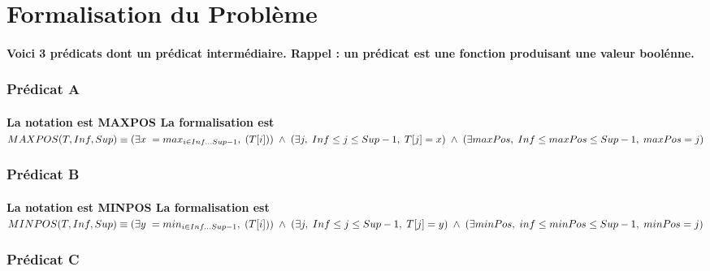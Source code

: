 \section{Formalisation du Problème}\label{formalisation}
\paragraph{Voici 3 prédicats dont un prédicat intermédiaire. Rappel : un prédicat est une fonction produisant une valeur boolénne.}
\subsubsection{Prédicat A}
\paragraph{La notation est MAXPOS \newline \newline
La formalisation est $MAXPOS(T,Inf,Sup)\equiv\newline (\exists x\;= max_{i \in Inf...Sup-1},\;(T[i]))\;\wedge\; (\exists j,\;Inf\leq j \leq Sup-1,\;T[j]=x)\;\wedge\;(\exists maxPos,\;Inf\leq maxPos \leq Sup-1,\;maxPos=j) $} \newline
\subsubsection{Prédicat B}
\paragraph{La notation est MINPOS \newline \newline
La formalisation est $MINPOS(T,Inf,Sup)\equiv\newline (\exists y\;= min_{i \in Inf...Sup-1},\;(T[i]))\;\wedge\; (\exists j,\;Inf\leq j \leq Sup-1,\;T[j]=y)\;\wedge\;(\exists minPos,\;inf\leq minPos \leq Sup-1,\;minPos=j) $} \newline
\subsubsection{Prédicat C}
